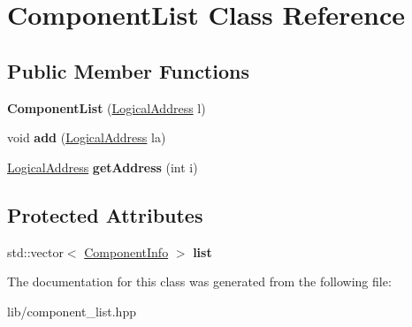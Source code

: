\hypertarget{classComponentList}{}\section{Component\+List Class Reference}
\label{classComponentList}
\subsection*{Public Member Functions}
\begin{DoxyCompactItemize}
\item 
\mbox{\label{classComponentList_ab260978fcc65754d836c6a3cb8b42341}} 
{\bfseries Component\+List} (\hyperlink{structLogicalAddress}{Logical\+Address} l)
\item 
\mbox{\label{classComponentList_a16746faf0795286b07d34315506a0940}} 
void {\bfseries add} (\hyperlink{structLogicalAddress}{Logical\+Address} la)
\item 
\mbox{\label{classComponentList_a19d60f3644b19fa267ea669e2e47d409}} 
\hyperlink{structLogicalAddress}{Logical\+Address} {\bfseries get\+Address} (int i)
\end{DoxyCompactItemize}
\subsection*{Protected Attributes}
\begin{DoxyCompactItemize}
\item 
\mbox{\label{classComponentList_abab41b240f17f716229e5abd5279dd9b}} 
std\+::vector$<$ \hyperlink{structComponentInfo}{Component\+Info} $>$ {\bfseries list}
\end{DoxyCompactItemize}


The documentation for this class was generated from the following file\+:\begin{DoxyCompactItemize}
\item 
lib/component\+\_\+list.\+hpp\end{DoxyCompactItemize}
